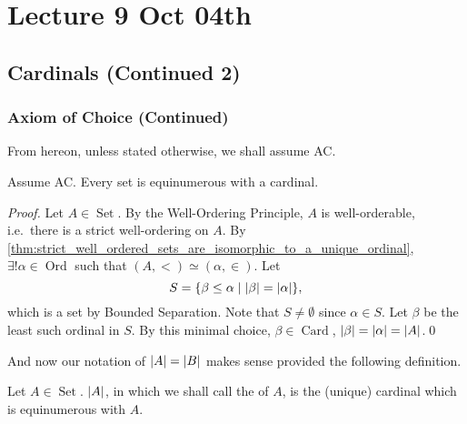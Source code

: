 \documentclass[notoc,notitlepage]{tufte-book}
\DeclareMathOperator{\Ord}{Ord }
\DeclareMathOperator{\Card}{Card }
\DeclareMathOperator{\Set}{Set }
\begin{document}



\chapter{Lecture 9 Oct 04th}%
\label{chp:lecture_9_oct_04th}

\section{Cardinals (Continued 2)}%
\label{sec:cardinals_continued_2}

\subsection{Axiom of Choice (Continued)}%
\label{sub:axiom_of_choice_continued}

From hereon, unless stated otherwise, we shall assume AC.

\begin{propo}\label{propo:using_cardinals_to_measure_sets}
  Assume AC. Every set is equinumerous with a cardinal.
\end{propo}

\begin{proof}
  Let $A \in \Set$. By the Well-Ordering Principle, $A$ is well-orderable, i.e.\ there is a strict well-ordering on $A$. By \cref{thm:strict_well_ordered_sets_are_isomorphic_to_a_unique_ordinal}, $\exists! \alpha \in \Ord$ such that $(A, <) \simeq (\alpha, \in)$. Let
  \begin{equation*}
    S = \{ \beta \leq \alpha \mid \left|\beta\right| = \left|\alpha\right| \},
  \end{equation*}
  which is a set by Bounded Separation. Note that $S \neq \emptyset$ since $\alpha \in S$. Let $\beta$ be the least such ordinal in $S$. By this minimal choice, $\beta \in \Card$, $\left|\beta\right| = \left|\alpha\right| = \left|A\right|$.\qed\
\end{proof}

And now our notation of $\left|A\right| = \left|B\right|$ makes sense provided the following definition.

\begin{defn}[Cardinality]\label{defn:cardinality}
  Let $A \in \Set$. $\left|A\right|$, in which we shall call the  of $A$, is the (unique) cardinal which is equinumerous with $A$.
\end{defn}
\end{document}
